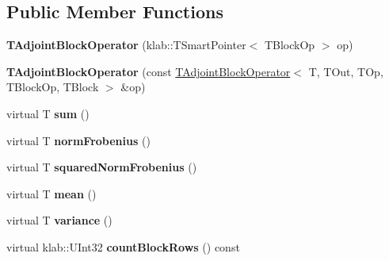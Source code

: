 \subsection*{Public Member Functions}
\begin{DoxyCompactItemize}
\item 
{\bfseries T\+Adjoint\+Block\+Operator} (klab\+::\+T\+Smart\+Pointer$<$ T\+Block\+Op $>$ op)\hypertarget{classkl1p_1_1TAdjointBlockOperator_ad174b513d1bbabdcc129a10aea904291}{}\label{classkl1p_1_1TAdjointBlockOperator_ad174b513d1bbabdcc129a10aea904291}

\item 
{\bfseries T\+Adjoint\+Block\+Operator} (const \hyperlink{classkl1p_1_1TAdjointBlockOperator}{T\+Adjoint\+Block\+Operator}$<$ T, T\+Out, T\+Op, T\+Block\+Op, T\+Block $>$ \&op)\hypertarget{classkl1p_1_1TAdjointBlockOperator_a96c27098ec64506e57941cc5fdee11ce}{}\label{classkl1p_1_1TAdjointBlockOperator_a96c27098ec64506e57941cc5fdee11ce}

\item 
virtual T {\bfseries sum} ()\hypertarget{classkl1p_1_1TAdjointBlockOperator_a0de8ff7ee0f79309d3a4b4d083f3a92c}{}\label{classkl1p_1_1TAdjointBlockOperator_a0de8ff7ee0f79309d3a4b4d083f3a92c}

\item 
virtual T {\bfseries norm\+Frobenius} ()\hypertarget{classkl1p_1_1TAdjointBlockOperator_ad8fae840d0e1718c4ed0258b33ebc22a}{}\label{classkl1p_1_1TAdjointBlockOperator_ad8fae840d0e1718c4ed0258b33ebc22a}

\item 
virtual T {\bfseries squared\+Norm\+Frobenius} ()\hypertarget{classkl1p_1_1TAdjointBlockOperator_a913d9700feba48bfec716025e813b1b6}{}\label{classkl1p_1_1TAdjointBlockOperator_a913d9700feba48bfec716025e813b1b6}

\item 
virtual T {\bfseries mean} ()\hypertarget{classkl1p_1_1TAdjointBlockOperator_a857605ab70a17b91833fe04036481946}{}\label{classkl1p_1_1TAdjointBlockOperator_a857605ab70a17b91833fe04036481946}

\item 
virtual T {\bfseries variance} ()\hypertarget{classkl1p_1_1TAdjointBlockOperator_ac3e42771190da51ed66ebcfc1db2629d}{}\label{classkl1p_1_1TAdjointBlockOperator_ac3e42771190da51ed66ebcfc1db2629d}

\item 
virtual klab\+::\+U\+Int32 {\bfseries count\+Block\+Rows} () const \hypertarget{classkl1p_1_1TAdjointBlockOperator_aa8209652742e0fcfe134aef6d0e71118}{}\label{classkl1p_1_1TAdjointBlockOperator_aa8209652742e0fcfe134aef6d0e71118}


\end{DoxyCompactItemize}
